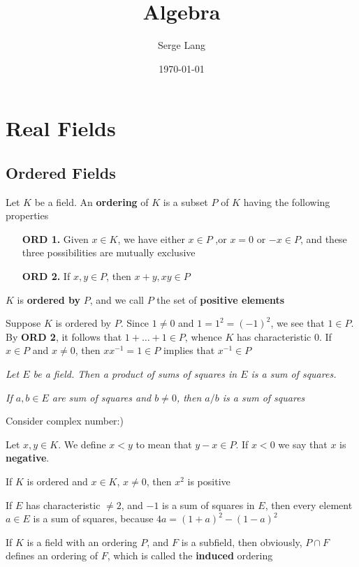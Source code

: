\documentclass[11pt]{article}
\author{Serge Lang}
\date{\today}
\title{Algebra}
\begin{document}
\maketitle
\tableofcontents \clearpage\section{Real Fields}
\label{sec:org5990011}
\subsection{Ordered Fields}
\label{sec:org6f67a81}
Let \(K\) be a field. An \textbf{ordering} of \(K\) is a subset \(P\) of \(K\)
having the following properties
\bigskip
\begin{itemize}[itemindent=3em]
\item[\textbf{ORD 1.}] Given \(x\in K\), we have either \(x\in P\) ,or \(x=0\) or
\(-x\in P\), and these three possibilities are mutually exclusive
\item[\textbf{ORD 2.}] If \(x,y\in P\), then \(x+y,xy\in P\)
\end{itemize}

\(K\) is \textbf{ordered by} \(P\), and we call \(P\) the set of \textbf{positive
elements}

Suppose \(K\) is ordered by \(P\). Since \(1\neq0\) and \(1=1^2=(-1)^2\), we
see that \(1\in P\). By \textbf{ORD 2}, it follows that \(1+\dots+1\in P\), whence \(K\)
has characteristic 0. If \(x\in P\) and \(x\neq0\), then \(xx^{-1}=1\in P\) implies
that \(x^{-1}\in P\)

\begin{center}
\emph{Let \(E\) be a field. Then a product of sums of squares in \(E\) is a sum
of squares.}

\emph{If \(a,b\in E\) are sum of squares and \(b\neq0\), then \(a/b\) is a sum of
squares}
\end{center}

Consider complex number:)

Let \(x,y\in K\). We define \(x<y\) to mean that \(y-x\in P\). If \(x<0\) we say
that \(x\) is \textbf{negative}.

If \(K\) is ordered and \(x\in K\), \(x\neq0\), then \(x^2\) is positive

If \(E\) has characteristic \(\neq2\), and \(-1\) is a sum of squares in \(E\),
then every element \(a\in E\) is a sum of squares, because
\(4a=(1+a)^2-(1-a)^2\)

If \(K\) is a field with an ordering \(P\), and \(F\) is a subfield, then
obviously, \(P\cap F\) defines an ordering of \(F\), which is called the
\textbf{induced} ordering
\end{document}

